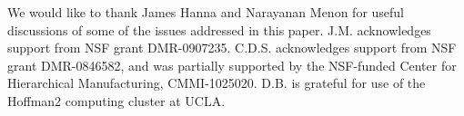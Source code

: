 \documentclass[preprint,aps]{revtex4}
\begin{document}

\begin{acknowledgements}
We would like to thank James Hanna and Narayanan Menon for useful discussions of some of the issues addressed in this paper.  J.M. acknowledges support from NSF grant DMR-0907235. C.D.S. acknowledges support from NSF grant DMR-0846582, and was partially supported by the NSF-funded Center for Hierarchical Manufacturing, CMMI-1025020. D.B. is grateful for use of the Hoffman2 computing cluster at UCLA.
\end{acknowledgements}




\end{document}

